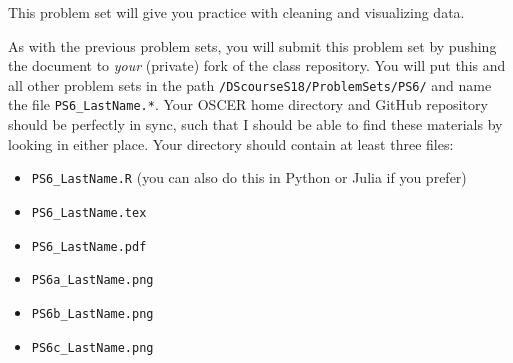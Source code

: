 \documentclass[12pt,english]{exam}
\begin{document}
This problem set will give you practice with cleaning and visualizing data.

As with the previous problem sets, you will submit this problem set by pushing the document to \emph{your} (private) fork of the class repository. You will put this and all other problem sets in the path \texttt{/DScourseS18/ProblemSets/PS6/} and name the file \texttt{PS6\_LastName.*}. Your OSCER home directory and GitHub repository should be perfectly in sync, such that I should be able to find these materials by looking in either place. Your directory should contain at least three files:
\begin{itemize}
    \item \texttt{PS6\_LastName.R} (you can also do this in Python or Julia if you prefer)
    \item \texttt{PS6\_LastName.tex}
    \item \texttt{PS6\_LastName.pdf}
    \item \texttt{PS6a\_LastName.png}
    \item \texttt{PS6b\_LastName.png}
    \item \texttt{PS6c\_LastName.png}
\end{itemize}
\end{document}
